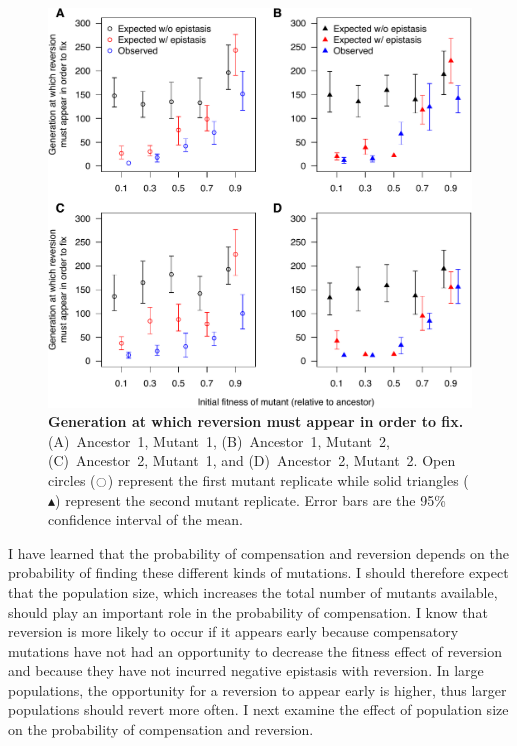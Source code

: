 \begin{doublespace}
\begin{figure}[th!]
\begin{center}
\includegraphics[width=\linewidth]{expected-rev.pdf}
\end{center}
\caption{{\bf Generation at which reversion must appear in order to fix.}
  (A)~Ancestor~1, Mutant~1, (B)~Ancestor~1, Mutant~2,
  (C)~Ancestor~2, Mutant~1, and (D)~Ancestor~2, Mutant~2.
  Open circles ($\ocircle$) represent the first mutant replicate
  while solid triangles ($\blacktriangle$)
  represent the second mutant replicate.
  Error bars are the 95\% confidence interval of the mean.}
\label{fig:expected-rev}
\end{figure}



I have learned that the probability of compensation and reversion
depends on the probability of finding these different kinds of mutations.
%
I should therefore expect that the population size,
which increases the total number of mutants available,
should play an important role in the probability of compensation.
%
I know that reversion is more likely to occur if it appears early
because compensatory mutations have not had an opportunity
to decrease the fitness effect of reversion
and because they have not incurred negative epistasis with reversion.
%
In large populations, the opportunity for a reversion to appear early
is higher, thus larger populations should revert more often.
%
I next examine the effect of population size on the probability
of compensation and reversion.




\end{doublespace}
